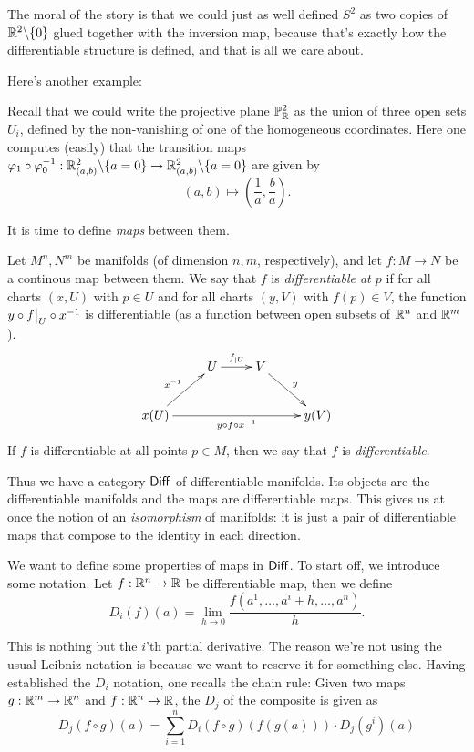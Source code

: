 \documentclass[11pt, english]{article}
\begin{document}
The moral of the story is that we could just as well defined $S^2$ as two copies of $\mathbb{R}^2 \backslash \{ 0\}$ glued together with the inversion map, because that's exactly how the differentiable structure is defined, and that is all we care about.

Here's another example:

\begin{example}
Recall that we could write the projective plane $\mathbb{P}_{\mathbb{R}}^2$ as the union of three open sets $U_i$, defined by the non-vanishing of one of the homogeneous coordinates. Here one computes (easily) that the transition maps $\varphi_1 \circ \varphi_0^{-1}:\mathbb{R}^2_{(a,b)} \backslash \{ a = 0 \}  \to \mathbb{R}^2_{(a,b)} \backslash \{ a = 0\}$ are given by \[(a,b) \mapsto \left (\frac{1}{a}, \frac{b}{a} \right).\]
\end{example}

It is time to define \emph{maps} between them.

\begin{defi}
Let $M^n,N^m$ be manifolds (of dimension $n,m$, respectively), and let $f:M \to N$ be a continous map between them. We say that $f$ is \emph{differentiable at $p$} if for all charts $(x,U)$ with $p \in U$ and for all charts $(y,V)$ with $f(p) \in V$, the function $y \circ \restr fU \circ x^{-1}$ is differentiable (as a function between open subsets of $\mathbb{R}^n$ and $\mathbb{R}^m$).
\[
\xymatrix{
 & U \ar[r]^{f_{|U}} & V \ar[dr]^y \\
x(U) \ar[ur]^{x^{-1}} \ar[rrr]_{y \circ f \circ x^{-1}}  & && y(V)
}
\]
If $f$ is differentiable at all points $p \in M$, then we say that $f$ is \emph{differentiable}.
\end{defi}

Thus we have a category $\mathsf{Diff}$ of differentiable manifolds. Its objects are the differentiable manifolds and the maps are differentiable maps. This gives us at once the notion of an \emph{isomorphism} of manifolds: it is just a pair of differentiable maps that compose to the identity in each direction.

We want to define some properties of maps in $\mathsf{Diff}$. To start off, we introduce some notation. Let $f:\mathbb{R}^n\to\mathbb{R}$ be differentiable map, then we define
\[
D_i (f)(a) = \lim_{h \to 0} \frac{f(a^1,\dotsc, a^i + h,\dotsc, a^n)}{h}.
\]

This is nothing but the $i$'th partial derivative. The reason we're not using the usual Leibniz notation is because we want to reserve it for something else. Having established the $D_i$ notation, one recalls the chain rule: Given two maps $g:\mathbb{R}^m \to \mathbb{R}^n$ and $f:\mathbb{R}^n \to \mathbb{R}$, the $D_j$ of the composite is given as
\[
D_j(f \circ g)(a) = \sum_{i=1}^n  D_i\left(f \circ g\right)(f(g(a))) \cdot D_j(g^i)(a)
\]
\end{document}
